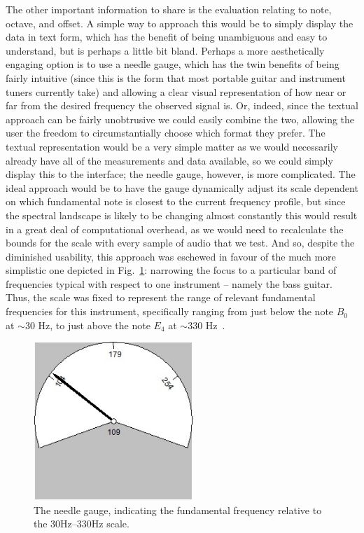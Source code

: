 \documentclass[12pt]{report}
\begin{document}
\indent The other important information to share is the evaluation relating to note, octave, and offset. A simple way to approach this would be to simply display the data in text form, which has the benefit of being unambiguous and easy to understand, but is perhaps a little bit bland. Perhaps a more aesthetically engaging option is to use a needle gauge, which has the twin benefits of being fairly intuitive (since this is the form that most portable guitar and instrument tuners currently take) and allowing a clear visual representation of how near or far from the desired frequency the observed signal is. Or, indeed, since the textual approach can be fairly unobtrusive we could easily combine the two, allowing the user the freedom to circumstantially choose which format they prefer. The textual representation would be a very simple matter as we would necessarily already have all of the measurements and data available, so we could simply display this to the interface; the needle gauge, however, is more complicated. The ideal approach would be to have the gauge dynamically adjust its scale dependent on which fundamental note is closest to the current frequency profile, but since the spectral landscape is likely to be changing almost constantly this would result in a great deal of computational overhead, as we would need to recalculate the bounds for the scale with every sample of audio that we test. And so, despite the diminished usability, this approach was eschewed in favour of the much more simplistic one depicted in Fig.~\ref{fig:gauge}: narrowing the focus to a particular band of frequencies typical with respect to one instrument -- namely the bass guitar. Thus, the scale was fixed to represent the range of relevant fundamental frequencies for this instrument, specifically ranging from just below the note $B_0$ at $\sim30$ Hz, to just above the note $E_4$ at $\sim330$ Hz~\cite{Anon2014a}.

\begin{figure}[!ht]
	\centering
	\includegraphics[width=60mm]{needlegauge.jpg}
	\caption[Tuner Needle Gauge]{The needle gauge, indicating the fundamental frequency relative to the 30Hz--330Hz scale.}
	\label{fig:gauge} 
\end{figure}
\end{document}
